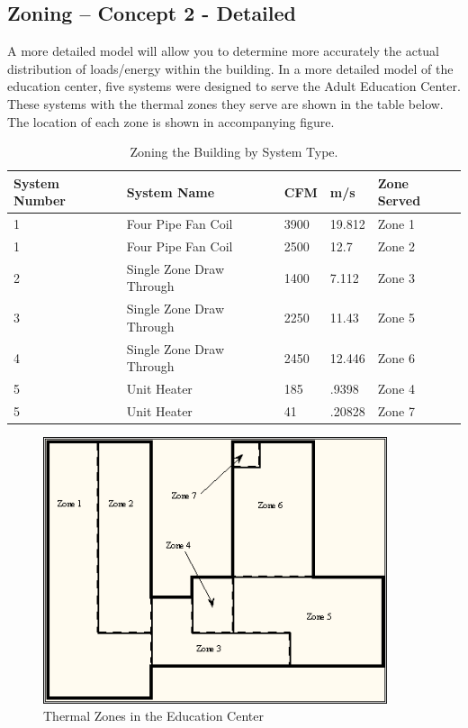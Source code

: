 \subsection{Zoning -- Concept 2 - Detailed}\label{zoning-concept-2---detailed}

A more detailed model will allow you to determine more accurately the actual distribution of loads/energy within the building. In a more detailed model of the education center, five systems were designed to serve the Adult Education Center. These systems with the thermal zones they serve are shown in the table below. The location of each zone is shown in accompanying figure.

\begin{longtable}[c]{@{}lllll@{}}
\caption{Zoning the Building by System Type. \protect \label{table:zoning-the-building-by-system-type.}}\\
\toprule 
System Number & System Name & CFM & m/s & Zone Served \tabularnewline \midrule
\endhead
1 & Four Pipe Fan Coil & 3900 & 19.812 & Zone 1 \tabularnewline
1 & Four Pipe Fan Coil & 2500 & 12.7 & Zone 2 \tabularnewline
2 & Single Zone Draw Through & 1400 & 7.112 & Zone 3 \tabularnewline
3 & Single Zone Draw Through & 2250 & 11.43 & Zone 5 \tabularnewline
4 & Single Zone Draw Through & 2450 & 12.446 & Zone 6 \tabularnewline
5 & Unit Heater & 185 & .9398 & Zone 4 \tabularnewline
5 & Unit Heater & 41 & .20828 & Zone 7 \tabularnewline
\bottomrule
\end{longtable}

\begin{figure}[hbtp] %
\centering
\includegraphics[width=0.9\textwidth, height=0.9\textheight, keepaspectratio=true]{media/image014.png}
\caption{Thermal Zones in the Education Center \protect \label{fig:thermal-zones-in-the-education-center}}
\end{figure}

